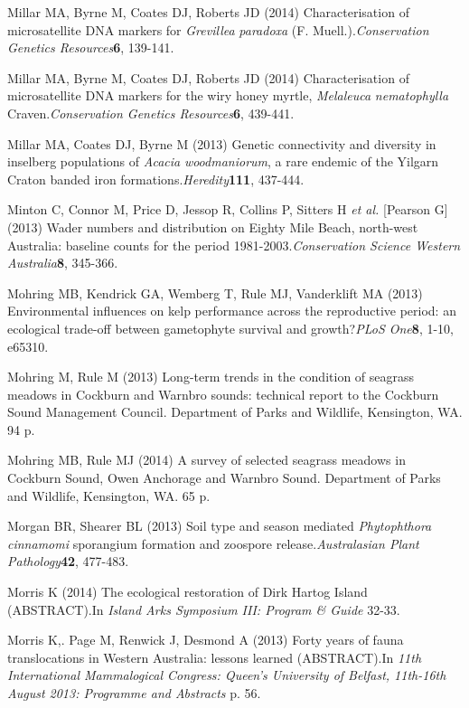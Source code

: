 \documentclass[version=last, paper=a4, DIV=18, usenames, dvipsnames]{scrartcl}
\begin{document}
Millar MA, Byrne M, Coates DJ, Roberts JD (2014) Characterisation of microsatellite DNA markers for \emph{Grevillea} \emph{paradoxa} (F. Muell.).\emph{Conservation Genetics Resources}\textbf{6}, 139-141.


Millar MA, Byrne M, Coates DJ, Roberts JD (2014) Characterisation of microsatellite DNA markers for the wiry honey myrtle, \emph{Melaleuca} \emph{nematophylla} Craven.\emph{Conservation Genetics Resources}\textbf{6}, 439-441.


Millar MA, Coates DJ, Byrne M (2013) Genetic connectivity and diversity in inselberg populations of \emph{Acacia} \emph{woodmaniorum}, a rare endemic of the Yilgarn Craton banded iron formations.\emph{Heredity}\textbf{111}, 437-444.


Minton C, Connor M, Price D, Jessop R, Collins P, Sitters H \emph{et al.} [Pearson G] (2013) Wader numbers and distribution on Eighty Mile Beach, north-west Australia: baseline counts for the period 1981-2003.\emph{Conservation Science Western Australia}\textbf{8}, 345-366.


Mohring MB, Kendrick GA, Wemberg T, Rule MJ, Vanderklift MA (2013) Environmental influences on kelp performance across the reproductive period: an ecological trade-off between gametophyte survival and growth?\emph{PLoS One}\textbf{8}, 1-10, e65310.


Mohring M, Rule M (2013) Long-term trends in the condition of seagrass meadows in Cockburn and Warnbro sounds: technical report to the Cockburn Sound Management Council. Department of Parks and Wildlife, Kensington, WA. 94 p.


Mohring MB, Rule MJ (2014) A survey of selected seagrass meadows in Cockburn Sound, Owen Anchorage and Warnbro Sound. Department of Parks and Wildlife, Kensington, WA. 65 p.


Morgan BR, Shearer BL (2013) Soil type and season mediated \emph{Phytophthora} \emph{cinnamomi} sporangium formation and zoospore release.\emph{Australasian Plant Pathology}\textbf{42}, 477-483.


Morris K (2014) The ecological restoration of Dirk Hartog Island (ABSTRACT).In \emph{Island Arks Symposium III: Program \& Guide} 32-33.


Morris K,. Page M, Renwick J, Desmond A (2013) Forty years of fauna translocations in Western Australia: lessons learned (ABSTRACT).In \emph{11th International Mammalogical Congress: Queen's University of Belfast, 11th-16th August 2013: Programme and Abstracts} p. 56.
\end{document}
